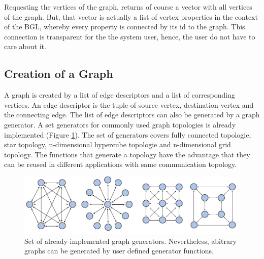 Requesting the vertices of the graph, returns of course a vector with
all vertices of the graph. But, that vector is actually a list of vertex
properties in the context of the BGL, whereby every property is
connected by its id to the graph. This connection is transparent for
the the system user, hence, the user do not have to care about it.


\subsection{Creation of a Graph}
A graph is created by a list of edge descriptors and a list of
corresponding vertices. An edge descriptor is the tuple of source vertex, destination
vertex and the connecting edge. The list of edge descriptors can
also be generated by a graph generator. A set generators for commonly used
graph topologies is already implemented (Figure \ref{fig:topologies}).
The set of generators covers fully connected topologie, star topology,
n-dimensional hypercube topologie and n-dimensional grid topology.
The functions that generate a topology have the advantage that
they can be reused in different applications with same communication
topology.

\begin{figure}[H]
  \centering
  \includegraphics[width=\textwidth]{graphics/40_topologies}
  \caption{Set of already implemented graph generators. Nevertheless,
  abitrary graphs can be generated by user defined generator functions.}
  \label{fig:topologies}
\end{figure}

